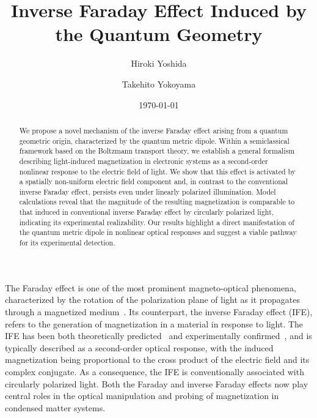 \documentclass[aps,prb,longbibliography,superscriptaddress,twocolumn]{revtex4-2}
\begin{document}
\title{Inverse Faraday Effect Induced by the Quantum Geometry}

\author{Hiroki Yoshida}
\author{Takehito Yokoyama}


\date{\today}


\begin{abstract}
    We propose a novel mechanism of the inverse Faraday effect arising from a quantum geometric origin, characterized by the quantum metric dipole. Within a semiclassical framework based on the Boltzmann transport theory, we establish a general formalism describing light-induced magnetization in electronic systems as a second-order nonlinear response to the electric field of light. We show that this effect is activated by a spatially non-uniform electric field component and, in contrast to the conventional inverse Faraday effect, persists even under linearly polarized illumination. Model calculations reveal that the magnitude of the resulting magnetization is comparable to that induced in conventional inverse Faraday effect by circularly polarized light, indicating its experimental realizability. Our results highlight a direct manifestation of the quantum metric dipole in nonlinear optical responses and suggest a viable pathway for its experimental detection.
\end{abstract}

\maketitle

The Faraday effect is one of the most prominent magneto-optical phenomena, characterized by the rotation of the polarization plane of light as it propagates through a magnetized medium~\cite{Faraday_1846}. Its counterpart, the inverse Faraday effect (IFE), refers to the generation of magnetization in a material in response to light. The IFE has been both theoretically predicted~\cite{Pitaevskii_1961,Pershan_1963} and experimentally confirmed~\cite{Zeil_Optically_1965}, and is typically described as a second-order optical response, with the induced magnetization being proportional to the cross product of the electric field and its complex conjugate. As a consequence, the IFE is conventionally associated with circularly polarized light. Both the Faraday and inverse Faraday effects now play central roles in the optical manipulation and probing of magnetization in condensed matter systems.
\end{document}
